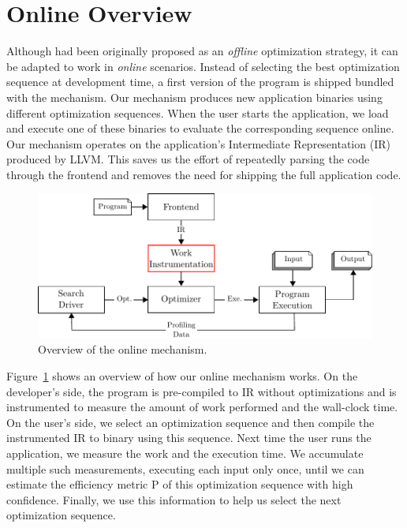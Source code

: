\section{Online {\IterComp} Overview} \label{sec:oic-infra}

Although {\itercomp} had been originally proposed as an \textit{offline} optimization strategy, it can be adapted to work in
\textit{online} scenarios. Instead of selecting the best optimization sequence at development time, a first version of the program is
shipped bundled with the {\itercomp} mechanism. Our mechanism produces new application binaries using different optimization sequences.
When the user starts the application, we load and execute one of these binaries to evaluate the corresponding sequence online. Our
mechanism operates on the application's Intermediate Representation (IR) produced by LLVM. This saves us the effort of repeatedly parsing
the code through the frontend and removes the need for shipping the full application code.

\begin{figure}[t]
    \centering
    \includegraphics[width=\linewidth]{figs/infra-diagram}
    \caption{Overview of the online \itercomp mechanism.}
    \label{fig:infra-diagram}
\end{figure}

Figure~\ref{fig:infra-diagram} shows an overview of how our online {\itercomp} mechanism works. On the developer's side, the program is
pre-compiled to IR without optimizations and is instrumented to measure the amount of work performed and the wall-clock time. On the user's
side, we select an optimization sequence and then compile the instrumented IR to binary using this sequence. Next time the user runs the
application, we measure the work and the execution time. We accumulate multiple such measurements, executing each input only once, until we
can estimate the efficiency metric P of this optimization sequence with high confidence. Finally, we use this information to help us select
the next optimization sequence.

